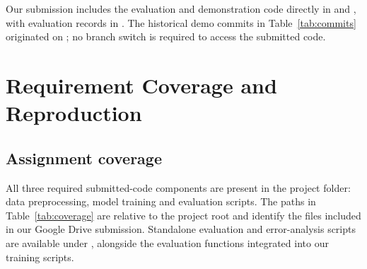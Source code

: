 Our submission includes the evaluation and demonstration code directly in
 and , with evaluation records in .
The historical demo commits in Table~\ref{tab:commits} originated on
; no branch switch is required to access the submitted code.
\FloatBarrier

\clearpage
\section{Requirement Coverage and Reproduction}\label{app:reproduce}
\subsection{Assignment coverage}
All three required submitted-code components are present in the project folder:
data preprocessing, model training and evaluation scripts. The paths in
Table~\ref{tab:coverage} are relative to the project root and identify the files
included in our Google Drive submission. Standalone evaluation and
error-analysis scripts are available under , alongside
the evaluation functions integrated into our training scripts.

